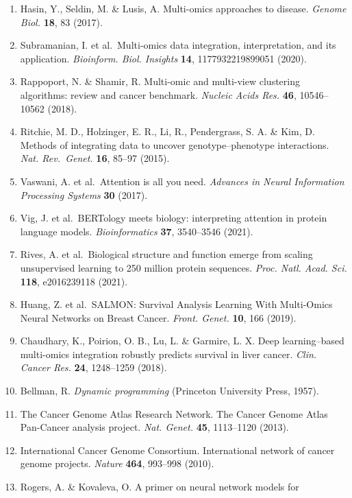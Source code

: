 \begin{enumerate}
\def\labelenumi{\arabic{enumi}.}
\item
  Hasin, Y., Seldin, M. \& Lusis, A. Multi-omics approaches to disease.
  \emph{Genome Biol.} \textbf{18}, 83 (2017).
\item
  Subramanian, I. et al.~Multi-omics data integration, interpretation,
  and its application. \emph{Bioinform. Biol. Insights} \textbf{14},
  1177932219899051 (2020).
\item
  Rappoport, N. \& Shamir, R. Multi-omic and multi-view clustering
  algorithms: review and cancer benchmark. \emph{Nucleic Acids Res.}
  \textbf{46}, 10546--10562 (2018).
\item
  Ritchie, M. D., Holzinger, E. R., Li, R., Pendergrass, S. A. \& Kim,
  D. Methods of integrating data to uncover genotype--phenotype
  interactions. \emph{Nat. Rev.~Genet.} \textbf{16}, 85--97 (2015).
\item
  Vaswani, A. et al.~Attention is all you need. \emph{Advances in Neural
  Information Processing Systems} \textbf{30} (2017).
\item
  Vig, J. et al.~BERTology meets biology: interpreting attention in
  protein language models. \emph{Bioinformatics} \textbf{37}, 3540--3546
  (2021).
\item
  Rives, A. et al.~Biological structure and function emerge from scaling
  unsupervised learning to 250 million protein sequences. \emph{Proc.
  Natl. Acad. Sci.} \textbf{118}, e2016239118 (2021).
\item
  Huang, Z. et al.~SALMON: Survival Analysis Learning With Multi-Omics
  Neural Networks on Breast Cancer. \emph{Front. Genet.} \textbf{10},
  166 (2019).
\item
  Chaudhary, K., Poirion, O. B., Lu, L. \& Garmire, L. X. Deep
  learning--based multi-omics integration robustly predicts survival in
  liver cancer. \emph{Clin. Cancer Res.} \textbf{24}, 1248--1259 (2018).
\item
  Bellman, R. \emph{Dynamic programming} (Princeton University Press,
  1957).
\item
  The Cancer Genome Atlas Research Network. The Cancer Genome Atlas
  Pan-Cancer analysis project. \emph{Nat. Genet.} \textbf{45},
  1113--1120 (2013).
\item
  International Cancer Genome Consortium. International network of
  cancer genome projects. \emph{Nature} \textbf{464}, 993--998 (2010).
\item
  Rogers, A. \& Kovaleva, O. A primer on neural network models for

\end{enumerate}
